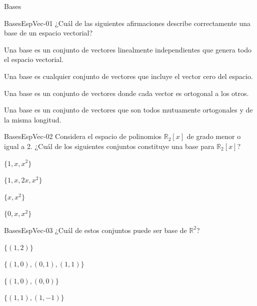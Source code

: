 \documentclass[a4,11pt]{aleph-notas}
\begin{document}
\begin{quiz}{Bases}

\begin{multi}[]%
    {BasesEspVec-01}
    ¿Cuál de las siguientes afirmaciones describe correctamente una base de un espacio vectorial?
    \item* Una base es un conjunto de vectores linealmente independientes que genera todo el espacio vectorial.
    \item Una base es cualquier conjunto de vectores que incluye el vector cero del espacio.
    \item Una base es un conjunto de vectores donde cada vector es ortogonal a los otros.
    \item Una base es un conjunto de vectores que son todos mutuamente ortogonales y de la misma longitud.
\end{multi}

\begin{multi}[]%
    {BasesEspVec-02}
    Considera el espacio de polinomios \( \mathbb{R}_2[x] \) de grado menor o igual a 2. ¿Cuál de los siguientes conjuntos constituye una base para \( \mathbb{R}_2[x] \)?
    \item* $\{1, x, x^2\}$
    \item $\{1, x, 2x, x^2\}$
    \item $\{x, x^2\}$
    \item $\{0, x, x^2\}$
\end{multi}

\begin{multi}[]%
    {BasesEspVec-03}
    ¿Cuál de estos conjuntos puede ser base de \( \mathbb{R}^2 \)?
    \item $\{(1, 2)\}$
    \item $\{(1, 0), (0, 1), (1, 1)\}$
    \item $\{(1, 0), (0, 0)\}$
    \item* $\{(1, 1), (1, -1)\}$
\end{multi}


\end{quiz}
\end{document}
